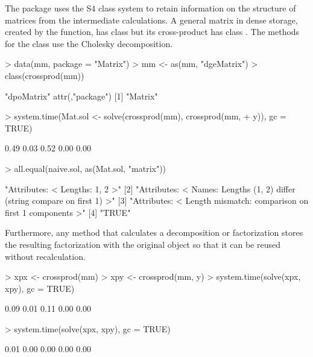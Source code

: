 \documentclass{article}
\begin{document}
The  package uses the S4 class system
\citep{R:Chambers:1998} to retain information on the structure of
matrices from the intermediate calculations.  A general matrix in
dense storage, created by the  function, has class
 but its cross-product has class .
The  methods for the  class use the
Cholesky decomposition.
\begin{Schunk}
\begin{Sinput}
> data(mm, package = "Matrix")
> mm <- as(mm, "dgeMatrix")
> class(crossprod(mm))
\end{Sinput}
\begin{Soutput}
[1] "dpoMatrix"
attr(,"package")
[1] "Matrix"
\end{Soutput}
\begin{Sinput}
> system.time(Mat.sol <- solve(crossprod(mm), crossprod(mm, 
+     y)), gc = TRUE)
\end{Sinput}
\begin{Soutput}
[1] 0.49 0.03 0.52 0.00 0.00
\end{Soutput}
\begin{Sinput}
> all.equal(naive.sol, as(Mat.sol, "matrix"))
\end{Sinput}
\begin{Soutput}
[1] "Attributes: < Lengths: 1, 2 >"                                           
[2] "Attributes: < Names: Lengths (1, 2) differ (string compare on first 1) >"
[3] "Attributes: < Length mismatch: comparison on first 1 components >"       
[4] "TRUE"                                                                    
\end{Soutput}
\end{Schunk}

Furthermore, any method that calculates a
decomposition or factorization stores the resulting factorization with
the original object so that it can be reused without recalculation.
\begin{Schunk}
\begin{Sinput}
> xpx <- crossprod(mm)
> xpy <- crossprod(mm, y)
> system.time(solve(xpx, xpy), gc = TRUE)
\end{Sinput}
\begin{Soutput}
[1] 0.09 0.01 0.11 0.00 0.00
\end{Soutput}
\begin{Sinput}
> system.time(solve(xpx, xpy), gc = TRUE)
\end{Sinput}
\begin{Soutput}
[1] 0.01 0.00 0.00 0.00 0.00
\end{Soutput}
\end{Schunk}
\end{document}
